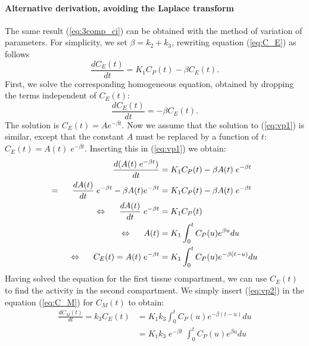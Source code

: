 \documentclass[11pt,oneside]{book}
\begin{document}
\paragraph{Alternative derivation, avoiding the Laplace transform\\}
The same result (\ref{eq:3comp_ci}) can be obtained with the method of
variation of parameters.
For simplicity, we set $\beta = k_2 + k_3$,
rewriting equation (\ref{eq:C_E}) as follows
\begin{equation}
   \frac{dC_E(t)}{dt}  =  K_1 C_P(t) - \beta C_E(t). \label{eq:vp1}
\end{equation}
First, we solve the corresponding homogeneous equation, obtained by
dropping the terms independent of $C_E(t)$:
\begin{equation}
   \frac{dC_E(t)}{dt}  =  - \beta C_E(t).
\end{equation}
The solution is $C_E(t) = A e^{-\beta t}$. Now we assume that the
solution to (\ref{eq:vp1}) is similar, except that the constant $A$
must be replaced by a function of $t$: $C_E(t) = A(t) \; e^{-\beta
t}$. Inserting this in (\ref{eq:vp1}) we obtain:
\begin{align}
   \frac{d ( A(t) \; e^{-\beta t})}{dt} 
             &=  K_1 C_P(t) - \beta A(t) \; e^{-\beta t}\\
 = \hspace{5mm} 
   \frac{d A(t)}{dt} \; e^{-\beta t} - \beta A(t) e^{-\beta t} 
              &= K_1 C_P(t) - \beta A(t) \; e^{-\beta t}\\
\Leftrightarrow  \hspace{5mm} 
   \frac{d A(t)}{dt} \; e^{-\beta t} &= K_1 C_P(t)\\
\Leftrightarrow  \hspace{5mm} 
   A(t) &= K_1 \int_0^t C_P(u) e^{\beta u} du\\
\Leftrightarrow  \hspace{5mm} 
   C_E(t) = A(t)  \; e^{-\beta t}
      &= K_1 \int_0^t C_P(u) e^{- \beta (t -u)} du \label{eq:vp2}
\end{align}
%
Having solved the equation for the first tissue compartment, we can
use $C_E(t)$ to find the activity in the second compartment.  We
simply insert (\ref{eq:vp2}) in the equation (\ref{eq:C_M}) for
$C_M(t)$ to obtain:
\begin{align}
  \frac{d C_M(t)}{dt} = k_3 C_E(t) 
    &= K_1 k_3 \int_0^t C_P(u) e^{- \beta (t -u)} du \nonumber\\
    &= K_1 k_3 \; e^{- \beta t} \; \int_0^t C_P(u) e^{\beta u} du
\end{align}
\end{document}
